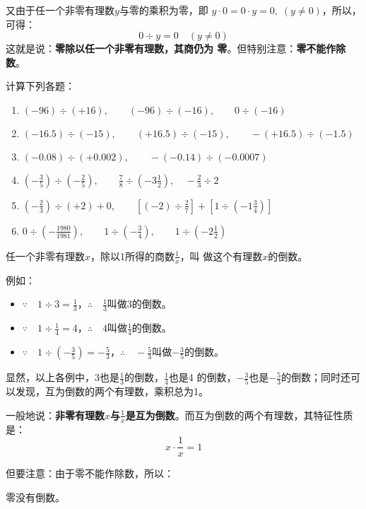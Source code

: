 又由于任一个非零有理数$y$与零的乘积为零，即
$y\cdot 0=0\cdot y=0,\; (y\ne 0)$，所以，可得：
\[0\div y=0\quad  (y\ne 0)\]
这就是说：\textbf{零除以任一个非零有理数，其商仍为
	零}。但特别注意：\textbf{零不能作除数}。


\begin{ex}
	计算下列各题：
	\begin{enumerate}
		\item $(-96)\div (+16),\qquad (-96)\div (-16),\qquad 0\div (-16)$
		\item $(-16.5)\div (-15),\qquad (+16.5)\div (-15),\qquad -(+16.5)\div (-1.5)$
		\item $(-0.08)\div(+0.002),\qquad -(-0.14)\div (-0.0007)$
		\item $\left(-\frac{3}{5}\right)\div \left(-\frac{2}{5}\right),\qquad \frac{7}{8}\div \left(-3\frac{1}{2}\right),\quad -\frac{2}{3}\div 2$
		\item $\left(-\frac{2}{3}\right)\div (+2) +0,\qquad \left[(-2)\div \frac{2}{7}\right]+\left[1\div\left(-1\frac{3}{4}\right)\right]$
		\item $0\div \left(-\frac{1980}{1981}\right),\qquad 1\div\left(-\frac{3}{4}\right),\qquad 1\div\left(-2\frac{1}{2}\right)$
	\end{enumerate}
\end{ex}

\begin{blk}{}
	任一个非零有理数$x$，除以1所得的商数$\frac{1}{x}$，叫
	做这个有理数$x$的倒数。
\end{blk}

例如：
\begin{itemize}
	\item $\because\quad 1\div 3=\frac{1}{3}$，\qquad $\therefore\quad \frac{1}{3}$叫做3的倒数。
	\item $\because\quad 1\div \frac{1}{4}=4$，\qquad $\therefore\quad 4$叫做$\frac{1}{4}$的倒数。
	\item $\because\quad 1\div \left(-\frac{3}{5}\right)=-\frac{5}{3}$，\qquad  $\therefore\quad -\frac{5}{3}$叫做$-\frac{3}{5}$的倒数。
\end{itemize}

显然，以上各例中，3也是$\frac{1}{3}$的倒数，$\frac{1}{4}$也是4
的倒数，$-\frac{3}{5}$也是$-\frac{5}{3}$的倒数；同时还可以发现，互为倒数的两个有理数，乘积总为1。

一般地说：\textbf{非零有理数$x$与$\frac{1}{x}$是互为倒数}。而互为倒数的两个有理数，其特征性质是：
\[x\cdot \frac{1}{x}=1\]

但要注意：由于零不能作除数，所以：
\begin{blk}{}
	零没有倒数。
\end{blk}

